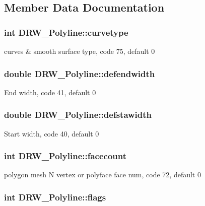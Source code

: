 \subsection{Member Data Documentation}
\hypertarget{classDRW__Polyline_a9cd44431960f6b199c218da6ca475fdb}{
\subsubsection[{curvetype}]{\setlength{\rightskip}{0pt plus 5cm}int D\-R\-W\-\_\-\-Polyline\-::curvetype}}\label{classDRW__Polyline_a9cd44431960f6b199c218da6ca475fdb}
curves \& smooth surface type, code 75, default 0 \hypertarget{classDRW__Polyline_a8818ce849a6704cb7d83ba7792f3db50}{
\subsubsection[{defendwidth}]{\setlength{\rightskip}{0pt plus 5cm}double D\-R\-W\-\_\-\-Polyline\-::defendwidth}}\label{classDRW__Polyline_a8818ce849a6704cb7d83ba7792f3db50}
End width, code 41, default 0 \hypertarget{classDRW__Polyline_a47b35f26221533fdd0d7ef2d91925ca3}{
\subsubsection[{defstawidth}]{\setlength{\rightskip}{0pt plus 5cm}double D\-R\-W\-\_\-\-Polyline\-::defstawidth}}\label{classDRW__Polyline_a47b35f26221533fdd0d7ef2d91925ca3}
Start width, code 40, default 0 \hypertarget{classDRW__Polyline_ae7e68c83478c4dad5550cfc44fa524bd}{
\subsubsection[{facecount}]{\setlength{\rightskip}{0pt plus 5cm}int D\-R\-W\-\_\-\-Polyline\-::facecount}}\label{classDRW__Polyline_ae7e68c83478c4dad5550cfc44fa524bd}
polygon mesh N vertex or polyface face num, code 72, default 0 \hypertarget{classDRW__Polyline_a328f232ca859ae9f5561e78457833099}{
\subsubsection[{flags}]{\setlength{\rightskip}{0pt plus 5cm}int D\-R\-W\-\_\-\-Polyline\-::flags}}\label{classDRW__Polyline_a328f232ca859ae9f5561e78457833099}
